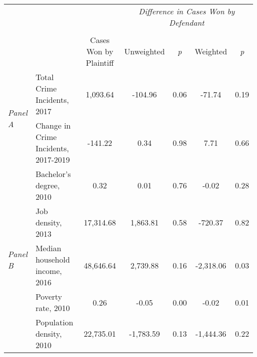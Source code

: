 \begin{tabular}{llccccc}
\toprule
 &  & \textit{} & \multicolumn{4}{c}{\textit{Difference in Cases Won by Defendant}} \\
\cline{4-7}
\\
 &  & Cases Won by Plaintiff & Unweighted & \emph{p} & Weighted & \emph{p} \\
\midrule
\multirow[c]{2}{.75cm}{\textit{Panel A}} & Total Crime Incidents, 2017 & 1,093.64 & -104.96 & 0.06 & -71.74 & 0.19 \\
 & Change in Crime Incidents, 2017-2019 & -141.22 & 0.34 & 0.98 & 7.71 & 0.66 \\
\cline{1-7}
\multirow[c]{5}{.75cm}{\textit{Panel B}} & Bachelor's degree, 2010 & 0.32 & 0.01 & 0.76 & -0.02 & 0.28 \\
 & Job density, 2013 & 17,314.68 & 1,863.81 & 0.58 & -720.37 & 0.82 \\
 & Median household income, 2016 & 48,646.64 & 2,739.88 & 0.16 & -2,318.06 & 0.03 \\
 & Poverty rate, 2010 & 0.26 & -0.05 & 0.00 & -0.02 & 0.01 \\
 & Population density, 2010 & 22,735.01 & -1,783.59 & 0.13 & -1,444.36 & 0.22 \\
\cline{1-7}
\bottomrule
\end{tabular}
